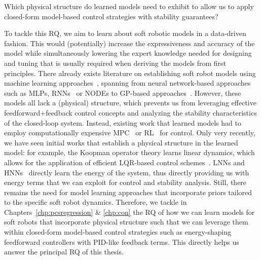 \begin{researchquestion}\label{rq:physical_structure_learned_models}
    Which physical structure do learned models need to exhibit to allow us to apply closed-form model-based control strategies with stability guarantees? 
\end{researchquestion}
To tackle this \gls{RQ}, we aim to learn about soft robotic models in a data-driven fashion. This would (potentially) increase the expressiveness and accuracy of the model while simultaneously lowering the expert knowledge needed for designing and tuning that is usually required when deriving the models from first principles.
There already exists literature on establishing soft robot models using machine learning approaches~\cite{armanini2023soft, kim2021review, chen2024data}, spanning from neural network-based approaches~\cite{thuruthel2017learning} such as \glspl{MLP}, \glspl{RNN}~\cite{schafke2024learning} or \glspl{NODE} to \gls{GP}-based approaches~\cite{sabelhaus2021gaussian}.
However, these models all lack a (physical) structure, which prevents us from leveraging effective feedforward+feedback control concepts and analyzing the stability characteristics of the closed-loop system. Instead, existing work that learned models had to employ computationally expensive \gls{MPC}~\cite{gillespie2018learning, alora2023robust, schafke2024learning} or \gls{RL}~\cite{thuruthel2018model} for control.
Only very recently, we have seen initial works that establish a physical structure in the learned model: for example, the Koopman operator theory learns linear dynamics, which allows for the application of efficient \gls{LQR}-based control schemes~\cite{bruder2020data}. \glspl{LNN} and \glspl{HNN}~\cite{lutter2019deep} directly learn the energy of the system, thus directly providing us with energy terms that we can exploit for control and stability analysis.
Still, there remains the need for model learning approaches that incorporate priors tailored to the specific soft robot dynamics.
Therefore, we tackle in Chapters~\ref{chp:pcsregression} \& \ref{chp:con} the \gls{RQ} of how we can learn models for soft robots that incorporate physical structure such that we can leverage them within closed-form model-based control strategies such as energy-shaping feedforward controllers with PID-like feedback terms.
This directly helps us answer the principal \gls{RQ} of this thesis.


